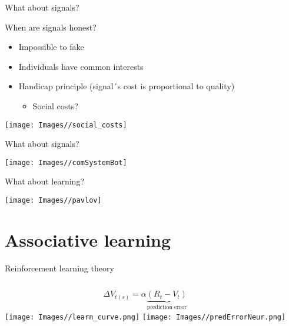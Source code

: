 \documentclass[
  ignorenonframetext,
]{beamer}
\providecommand{\tightlist}{%
  \setlength{\itemsep}{0pt}\setlength{\parskip}{0pt}}
\begin{document}
\begin{frame}{What about signals?}
\protect\hypertarget{what-about-signals-1}{}

\begin{block}{When are signals honest?}

\begin{itemize}
\tightlist
\item
  Impossible to fake
\item
  Individuals have common interests
\item
  Handicap principle (signal´s cost is proportional to quality)

  \begin{itemize}
  \tightlist
  \item
    Social costs?
  \end{itemize}
\end{itemize}

\begin{center}\texttt{[image: Images//social\_costs]} \end{center}

\end{block}

\end{frame}

\begin{frame}{What about signals?}
\protect\hypertarget{what-about-signals-2}{}

\begin{center}\texttt{[image: Images//comSystemBot]} \end{center}

\end{frame}

\begin{frame}{What about learning?}
\protect\hypertarget{what-about-learning}{}

\begin{center}\texttt{[image: Images//pavlov]} \end{center}

\end{frame}

\hypertarget{associative-learning}{%
\section{Associative learning}\label{associative-learning}}

\begin{frame}{Reinforcement learning theory}
\protect\hypertarget{reinforcement-learning-theory}{}

\begin{columns}[T]
 \begin{equation*}
  \Delta V_{t(s)}=\alpha \underbrace{(R_t-V_t)}_\text{prediction error}
  \end{equation*}
  \pause
  \texttt{[image: Images//learn\_curve.png]}
  \pause
  \texttt{[image: Images//predErrorNeur.png]}
\end{columns}

\end{frame}
\end{document}
